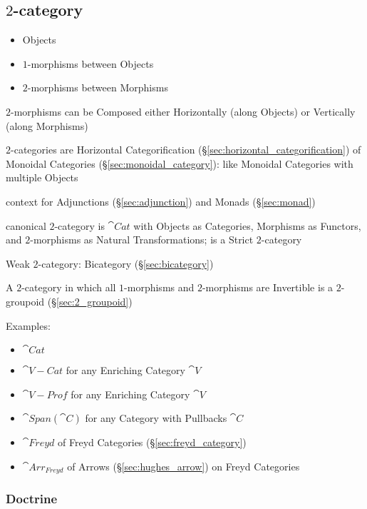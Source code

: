 \subsection{$2$-category}\label{sec:2_category}

\begin{itemize}
  \item Objects
  \item $1$-morphisms between Objects
  \item $2$-morphisms between Morphisms
\end{itemize}

$2$-morphisms can be Composed either Horizontally (along Objects) or
Vertically (along Morphisms)

$2$-categories are Horizontal Categorification
(\S\ref{sec:horizontal_categorification}) of Monoidal Categories
(\S\ref{sec:monoidal_category}): like Monoidal Categories with
multiple Objects

context for Adjunctions (\S\ref{sec:adjunction}) and Monads
(\S\ref{sec:monad})

canonical $2$-category is $\cat{Cat}$ with Objects as Categories,
Morphisms as Functors, and $2$-morphisms as Natural Transformations;
is a Strict $2$-category

Weak $2$-category: Bicategory (\S\ref{sec:bicategory})

A $2$-category in which all $1$-morphisms and $2$-morphisms are
Invertible is a $2$-groupoid (\S\ref{sec:2_groupoid})

Examples:
\begin{itemize}
\item $\cat{Cat}$
\item $\cat{V-Cat}$ for any Enriching Category $\cat{V}$
\item $\cat{V-Prof}$ for any Enriching Category $\cat{V}$
\item $\cat{Span}(\cat{C})$ for any Category with Pullbacks $\cat{C}$
\item $\cat{Freyd}$ of Freyd Categories (\S\ref{sec:freyd_category})
\item $\cat{Arr_{Freyd}}$ of Arrows (\S\ref{sec:hughes_arrow}) on
  Freyd Categories
\end{itemize}



\subsubsection{Doctrine}\label{sec:doctrine}

